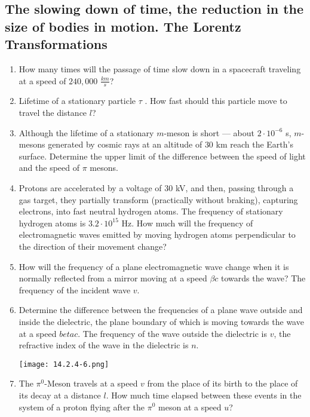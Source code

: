 \documentclass{article}
\begin{document}
\subsection{The slowing down of time, the reduction in the size of bodies in motion. The Lorentz Transformations}

\begin{enumerate}[label=14.2.\arabic*]

\item How many times will the passage of time slow down in a spacecraft traveling at a speed of $240,000$ $\frac{km}{s}$?

\item Lifetime of a stationary particle $\tau$ . How fast should this particle move to travel the distance $l$?

\item Although the lifetime of a stationary $m$-meson is short — about $2 \cdot 10^{-6}$ s, $m$-mesons generated by cosmic rays at an altitude of $30$ km reach the Earth's surface. Determine the upper limit of the difference between the speed of light and the speed of $\pi$ mesons.

\item Protons are accelerated by a voltage of $30$ kV, and then, passing through a gas target, they partially transform (practically without braking), capturing electrons, into fast neutral hydrogen atoms. The frequency of stationary hydrogen atoms is $3.2 \cdot 10^{15}$ Hz. How much will the frequency of electromagnetic waves emitted by moving hydrogen atoms perpendicular to the direction of their movement change?

\item How will the frequency of a plane electromagnetic wave change when it is normally reflected from a mirror moving at a speed $\beta c$ towards the wave? The frequency of the incident wave $v$.

\item Determine the difference between the frequencies of a plane wave outside and inside the dielectric, the plane boundary of which is moving towards the wave at a speed $beta c$. The frequency of the wave outside the dielectric is $v$, the refractive index of the wave in the dielectric is $n$.

\begin{center}
    \texttt{[image: 14.2.4-6.png]}
\end{center}

\item The $\pi^0$-Meson travels at a speed $v$ from the place of its birth to the place of its decay at a distance $l$. How much time elapsed between these events in the system of a proton flying after the $\pi^0$ meson at a speed $u$?


\end{enumerate}
\end{document}

